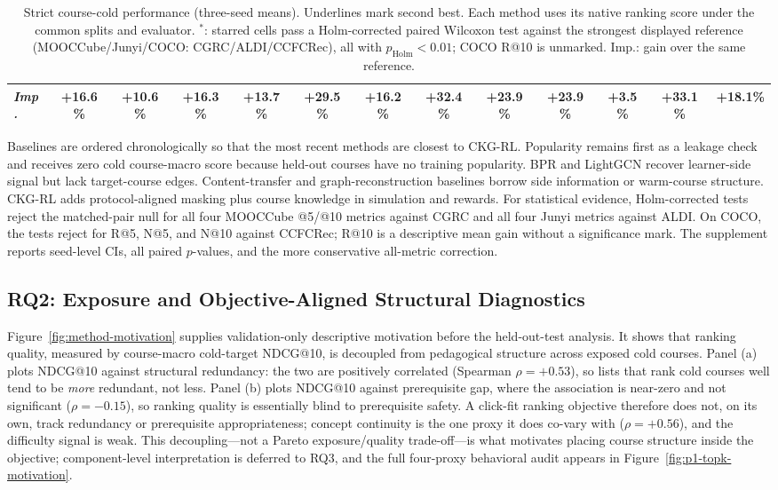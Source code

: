 \documentclass[letterpaper]{article}
\begin{document}
\begin{table}[t]
{\begin{tabular}{lcccccccccccc}
\emph{Imp.} & +16.6\% & +10.6\% & +16.3\% & +13.7\% & +29.5\% & +16.2\% & +32.4\% & +23.9\% & +23.9\% & +3.5\% & +33.1\% & +18.1\% \\
\bottomrule
\end{tabular}
}
\caption{Strict course-cold performance (three-seed means). Underlines mark second best. Each method uses its native ranking score under the common splits and evaluator. \(^{*}\): starred cells pass a Holm-corrected paired Wilcoxon test against the strongest displayed reference (MOOCCube/Junyi/COCO: CGRC/ALDI/CCFCRec), all with \(p_{\mathrm{Holm}}<0.01\); COCO R@10 is unmarked. Imp.: gain over the same reference.}
\label{tab:main-cold-results}
\end{table}

Baselines are ordered chronologically so that the most recent methods are closest to CKG-RL. Popularity remains first as a leakage check and receives zero cold course-macro score because held-out courses have no training popularity. BPR and LightGCN recover learner-side signal but lack target-course edges. Content-transfer and graph-reconstruction baselines borrow side information or warm-course structure. CKG-RL adds protocol-aligned masking plus course knowledge in simulation and rewards. For statistical evidence, Holm-corrected tests reject the matched-pair null for all four MOOCCube @5/@10 metrics against CGRC and all four Junyi metrics against ALDI. On COCO, the tests reject for R@5, N@5, and N@10 against CCFCRec; R@10 is a descriptive mean gain without a significance mark. The supplement reports seed-level CIs, all paired \(p\)-values, and the more conservative all-metric correction.

\subsection{RQ2: Exposure and Objective-Aligned Structural Diagnostics}
Figure~\ref{fig:method-motivation} supplies validation-only descriptive motivation before the held-out-test analysis. It shows that ranking quality, measured by course-macro cold-target NDCG@10, is decoupled from pedagogical structure across exposed cold courses. Panel (a) plots NDCG@10 against structural redundancy: the two are positively correlated (Spearman $\rho=+0.53$), so lists that rank cold courses well tend to be \emph{more} redundant, not less. Panel (b) plots NDCG@10 against prerequisite gap, where the association is near-zero and not significant ($\rho=-0.15$), so ranking quality is essentially blind to prerequisite safety. A click-fit ranking objective therefore does not, on its own, track redundancy or prerequisite appropriateness; concept continuity is the one proxy it does co-vary with ($\rho=+0.56$), and the difficulty signal is weak. This decoupling---not a Pareto exposure/quality trade-off---is what motivates placing course structure inside the objective; component-level interpretation is deferred to RQ3, and the full four-proxy behavioral audit appears in Figure~\ref{fig:p1-topk-motivation}.
\end{document}
